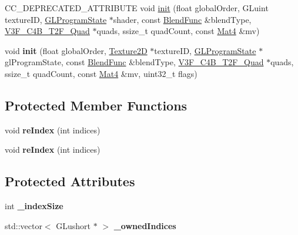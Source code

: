 \begin{DoxyCompactItemize}
\item 
C\+C\+\_\+\+D\+E\+P\+R\+E\+C\+A\+T\+E\+D\+\_\+\+A\+T\+T\+R\+I\+B\+U\+TE void \hyperlink{classQuadCommand_a19f82b13c6e8207dfaf04804f085ec43}{init} (float global\+Order, G\+Luint texture\+ID, \hyperlink{classGLProgramState}{G\+L\+Program\+State} $\ast$shader, const \hyperlink{structBlendFunc}{Blend\+Func} \&blend\+Type, \hyperlink{structV3F__C4B__T2F__Quad}{V3\+F\+\_\+\+C4\+B\+\_\+\+T2\+F\+\_\+\+Quad} $\ast$quads, ssize\+\_\+t quad\+Count, const \hyperlink{classMat4}{Mat4} \&mv)
\item 
\mbox{\label{classQuadCommand_a1606b3525771b9cb36559e1423da2428}} 
void {\bfseries init} (float global\+Order, \hyperlink{classTexture2D}{Texture2D} $\ast$texture\+ID, \hyperlink{classGLProgramState}{G\+L\+Program\+State} $\ast$gl\+Program\+State, const \hyperlink{structBlendFunc}{Blend\+Func} \&blend\+Type, \hyperlink{structV3F__C4B__T2F__Quad}{V3\+F\+\_\+\+C4\+B\+\_\+\+T2\+F\+\_\+\+Quad} $\ast$quads, ssize\+\_\+t quad\+Count, const \hyperlink{classMat4}{Mat4} \&mv, uint32\+\_\+t flags)
\end{DoxyCompactItemize}
\subsection*{Protected Member Functions}
\begin{DoxyCompactItemize}
\item 
\mbox{\label{classQuadCommand_a6d2a9ef8fbda30d24399512f9e9c671f}} 
void {\bfseries re\+Index} (int indices)
\item 
\mbox{\label{classQuadCommand_a6d2a9ef8fbda30d24399512f9e9c671f}} 
void {\bfseries re\+Index} (int indices)
\end{DoxyCompactItemize}
\subsection*{Protected Attributes}
\begin{DoxyCompactItemize}
\item 
\mbox{\label{classQuadCommand_a15e85de239c17402db6769825793b4be}} 
int {\bfseries \+\_\+index\+Size}
\item 
\mbox{\label{classQuadCommand_a0c281ee6faef905db045c8045a2f9d8c}} 
std\+::vector$<$ G\+Lushort $\ast$ $>$ {\bfseries \+\_\+owned\+Indices}
\end{DoxyCompactItemize}
